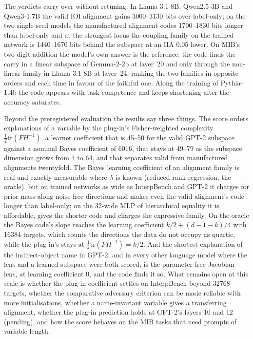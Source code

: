 \documentclass[11pt,a4paper]{article}
\begin{document}
The verdicts carry over without retuning. In Llama-3.1-8B, Qwen2.5-3B and Qwen3-1.7B the valid IOI alignment gains 3000--3130 bits over label-only; on the two single-seed models the manufactured alignment codes 1700--1830 bits longer than label-only and at the strongest locus the coupling family on the trained network is 1440--1670 bits behind the subspace at an IIA 0.05 lower. On MIB's two-digit addition the model's own answer is the reference: the code finds the carry in a linear subspace of Gemma-2-2b at layer~20 and only through the non-linear family in Llama-3.1-8B at layer~24, ranking the two families in opposite orders and each time in favour of the faithful one. Along the training of Pythia-1.4b the code appears with task competence and keeps shortening after the accuracy saturates.

Beyond the preregistered evaluation the results say three things. The score orders explanations of a variable by the plug-in's Fisher-weighted complexity $\tfrac12\mathrm{tr}(FH^{-1})$, a learner coefficient that is 45--50 for the valid GPT-2 subspace against a nominal Bayes coefficient of 6016, that stays at 49--79 as the subspace dimension grows from 4 to 64, and that separates valid from manufactured alignments twentyfold. The Bayes learning coefficient of an alignment family is real and exactly measurable where $\lambda$ is known (reduced-rank regression, the oracle), but on trained networks as wide as InterpBench and GPT-2 it charges for prior mass along noise-free directions and makes even the valid alignment's code longer than label-only; on the 32-wide MLP of hierarchical equality it is affordable, gives the shorter code and charges the expressive family. On the oracle the Bayes code's slope reaches the learning coefficient $k/2+(d-1-k)/4$ with 16384 targets, which counts the directions the data do not occupy as quartic, while the plug-in's stays at $\tfrac12\mathrm{tr}(FH^{-1})=k/2$. And the shortest explanation of the indirect-object name in GPT-2, and in every other language model where the lens and a learned subspace were both scored, is the parameter-free Jacobian lens, at learning coefficient 0, and the code finds it so. What remains open at this scale is whether the plug-in coefficient settles on InterpBench beyond 32768 targets, whether the comparative adversary criterion can be made reliable with more initialisations, whether a name-invariant variable gives a transferring alignment, whether the plug-in prediction holds at GPT-2's layers 10 and 12 (pending), and how the score behaves on the MIB tasks that need prompts of variable length.
\appendix
\end{document}
